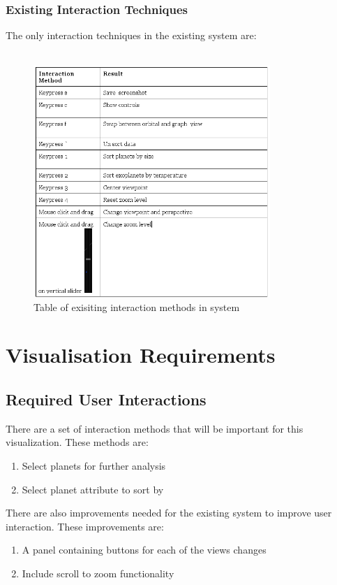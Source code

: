 \documentclass[11pt
              , a4paper
              , twoside
              , openright
              ]{report}
\begin{document}
\subsection{Existing Interaction Techniques}
The only interaction techniques in the existing system are:
\\\\
\begin{figure}[h!]
  \centering
      \includegraphics[width=0.8\textwidth]{images/table.jpg}
  \caption{Table of exisiting interaction methods in system}
\end{figure}

\chapter{Visualisation Requirements}
\section{Required User Interactions}
There are a set of interaction methods that will be important for this visualization. These methods are:
\begin{enumerate}
 \item Select planets for further analysis
 \item Select planet attribute to sort by
\end{enumerate}

There are also improvements needed for the existing system to improve user interaction. These improvements are:
\begin{enumerate}
 \item A panel containing buttons for each of the views changes
 \item Include scroll to zoom functionality
\end{enumerate}
\end{document}
